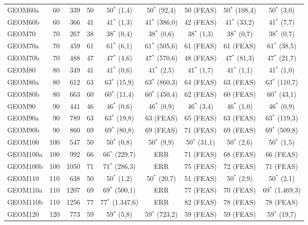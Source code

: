 \begin{longtable}{lrrcccccc}
GEOM60a & 60 & 339 & 50 & 50$^{*}$ (1,4) & 50$^{*}$ (92,4) & 50 (FEAS) & 50$^{*}$ (108,4) & 50$^{*}$ (3,0) \\
GEOM60b & 60 & 366 & 41 & 41$^{*}$ (1,3) & 41$^{*}$ (386,0) & 42 (FEAS) & 41$^{*}$ (33,2) & 41$^{*}$ (7,7) \\
GEOM70 & 70 & 267 & 38 & 38$^{*}$ (0,4) & 38$^{*}$ (0,6) & 38$^{*}$ (1,3) & 38$^{*}$ (0,7) & 38$^{*}$ (0,7) \\
GEOM70a & 70 & 459 & 61 & 61$^{*}$ (6,1) & 61$^{*}$ (505,6) & 61 (FEAS) & 61 (FEAS) & 61$^{*}$ (38,5) \\
GEOM70b & 70 & 488 & 47 & 47$^{*}$ (4,6) & 47$^{*}$ (570,6) & 48 (FEAS) & 47$^{*}$ (81,3) & 47$^{*}$ (21,7) \\
GEOM80 & 80 & 349 & 41 & 41$^{*}$ (0,6) & 41$^{*}$ (2,5) & 41$^{*}$ (1,7) & 41$^{*}$ (1,1) & 41$^{*}$ (1,0) \\
GEOM80a & 80 & 612 & 63 & 63$^{*}$ (15,9) & 63$^{*}$ (860,3) & 64 (FEAS) & 63 (FEAS) & 63$^{*}$ (110,7) \\
GEOM80b & 80 & 663 & 60 & 60$^{*}$ (11,4) & 60$^{*}$ (450,4) & 62 (FEAS) & 60 (FEAS) & 60$^{*}$ (43,1) \\
GEOM90 & 90 & 441 & 46 & 46$^{*}$ (0,6) & 46$^{*}$ (0,9) & 46$^{*}$ (3,4) & 46$^{*}$ (1,0) & 46$^{*}$ (0,9) \\
GEOM90a & 90 & 789 & 63 & 63$^{*}$ (19,8) & 63 (FEAS) & 65 (FEAS) & 63 (FEAS) & 63$^{*}$ (119,3) \\
GEOM90b & 90 & 860 & 69 & 69$^{*}$ (80,8) & 69 (FEAS) & 71 (FEAS) & 69 (FEAS) & 69$^{*}$ (509,8) \\
GEOM100 & 100 & 547 & 50 & 50$^{*}$ (0,8) & 50$^{*}$ (9,9) & 50$^{*}$ (31,1) & 50$^{*}$ (2,6) & 50$^{*}$ (1,5) \\
GEOM100a & 100 & 992 & 66 & 66$^{*}$ (229,7) & ERR & 71 (FEAS) & 68 (FEAS) & 66 (FEAS) \\
GEOM100b & 100 & 1050 & 71 & 71$^{*}$ (286,3) & ERR & 75 (FEAS) & 72 (FEAS) & 71 (FEAS) \\
GEOM110 & 110 & 638 & 50 & 50$^{*}$ (1,2) & 50$^{*}$ (20,7) & 51 (FEAS) & 50$^{*}$ (2,9) & 50$^{*}$ (2,1) \\
GEOM110a & 110 & 1207 & 69 & 69$^{*}$ (500,1) & ERR & 77 (FEAS) & 70 (FEAS) & 69$^{*}$ (1.469,3) \\
GEOM110b & 110 & 1256 & 77 & 77$^{*}$ (1.347,6) & ERR & 82 (FEAS) & 78 (FEAS) & 78 (FEAS) \\
GEOM120 & 120 & 773 & 59 & 59$^{*}$ (5,8) & 59$^{*}$ (723,2) & 59 (FEAS) & 59 (FEAS) & 59$^{*}$ (19,7) \\

\end{longtable}
